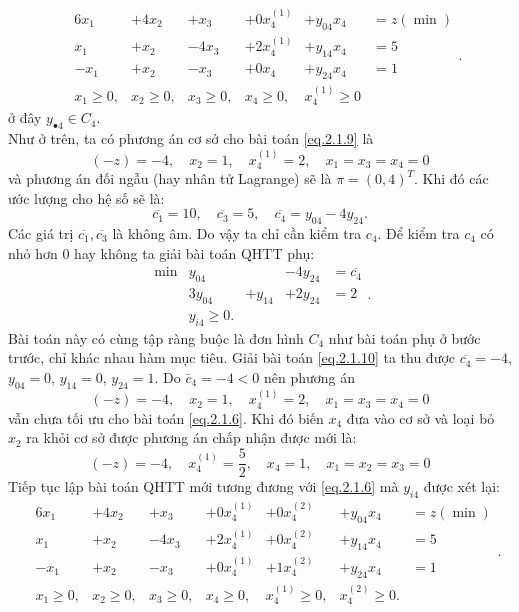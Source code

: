 \begin{equation}\label{eq.2.1.9}
\begin{array}{lllllll}
&6x_1&+4x_2&+x_3&+0x^{(1)}_4&+y_{04}x_4&=z(\min)\\
&x_1&+x_2&-4x_3&+2x^{(1)}_4&+y_{14}x_4&=5\\
&-x_1&+x_2&-x_3&+0x_4&+y_{24}x_4&=1\\
&x_1\geq 0,&x_2\geq 0,&x_3\geq 0,&x_4\geq 0,&x^{(1)}_4\geq 0
\end{array}.
\end{equation} 
ở đây $y_{\bullet 4}\in C_4$.\\
Như ở trên, ta có phương án cơ sở cho bài toán \eqref{eq.2.1.9} là
\begin{displaymath}
(-z)=-4,\quad x_2=1,\quad x^{(1)}_4=2,\quad x_1=x_3=x_4=0
\end{displaymath}
và phương án đối ngẫu (hay nhân tử Lagrange) sẽ là $\pi = (0, 4)^T$. Khi đó các ước lượng cho hệ số sẽ là:
$$
\overline{c_1}=10, \quad \overline{c_3}=5,\quad \overline{c_4}=y_{04}-4y_{24}.
$$
Các giá trị $\overline{c_1},\overline{c_3}$ là không âm. Do vậy ta chỉ cần kiểm tra $c_4$. Để kiểm tra $c_4$ có nhỏ hơn 0 hay không ta giải bài toán QHTT phụ:
\begin{equation}\label{eq.2.1.10}
\begin{array}{llllll}
\min &y_{04}&&-4y_{24}&=\overline{c_4}\\
&3y_{04}&+y_{14}&+2y_{24}&=2\\
&y_{i4}\geq0 .
\end{array}.
\end{equation}
Bài toán này có cùng tập ràng buộc là đơn hình $C_4$ như bài toán phụ ở bước trước, chỉ khác nhau hàm mục tiêu. Giải bài toán \eqref{eq.2.1.10} ta thu được $\overline{c_4}=-4$, $y_{04}=0$, $y_{14}=0$, $y_{24}=1$. Do $\bar c_4=-4<0$ nên phương án 
\begin{displaymath}
\label{126}(-z)=-4,\quad x_2=1,\quad x^{(1)}_4=2,\quad x_1=x_3=x_4=0
\end{displaymath}
vẫn chưa tối ưu cho bài toán \eqref{eq.2.1.6}. Khi đó biến $x_4$ đưa vào cơ sở và loại bỏ $x_2$ ra khỏi cơ sở được phương án chấp nhận được mới là:
\begin{displaymath}
(-z)=-4,\quad x^{(1)}_4=\frac{5}{2},\quad x_4=1,\quad x_1=x_2=x_3=0
\end{displaymath}
Tiếp tục lập bài toán QHTT mới tương đương với \eqref{eq.2.1.6} mà $y_{i4}$ được xét lại:
\begin{equation}\label{eq.2.1.11}
\begin{array}{lllllllll}
&6x_1&+4x_2&+x_3&+0x^{(1)}_4&+0x^{(2)}_4&+y_{04}x_4&=z(\min)\\
&x_1&+x_2&-4x_3&+2x^{(1)}_4&+0x^{(2)}_4&+y_{14}x_4&=5\\
&-x_1&+x_2&-x_3&+0x_4^{(1)}&+1x^{(2)}_4&+y_{24}x_4&=1\\
&x_1\geq0,&x_2\geq0,&x_3\geq0,&x_4\geq0,&x^{(1)}_4\geq0,&x^{(2)}_4\geq0.
\end{array}.
\end{equation} 
